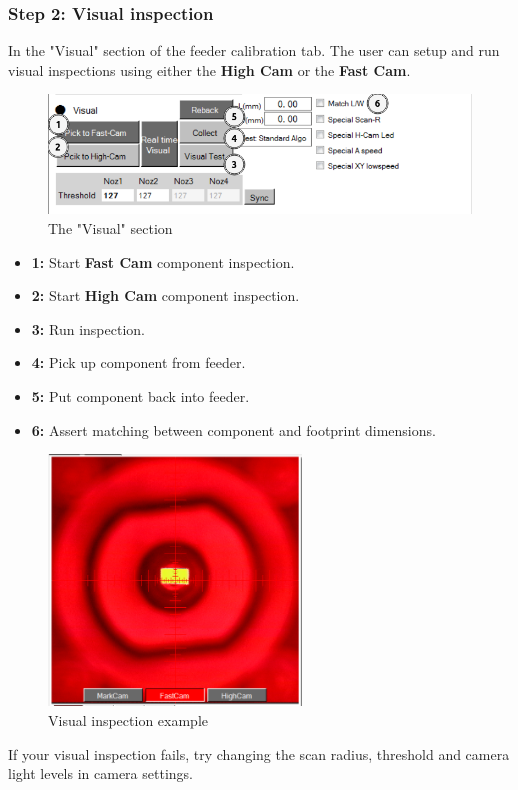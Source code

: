 \documentclass[a4paper,10pt]{report}
\begin{document}
\subsubsection{Step 2: Visual inspection}
In the "Visual" section of the feeder calibration tab. The user can setup and run visual inspections using either the \textbf{High Cam} or the \textbf{Fast Cam}.
 \begin{figure}[!htb]
 \centering
 \includegraphics[width=1\textwidth]{scrot25.png}
 \caption{The "Visual" section}
\end{figure}
\begin{itemize}
 \item \textbf{1:} Start \textbf{Fast Cam} component inspection.
 \item \textbf{2:} Start \textbf{High Cam} component inspection.
 \item \textbf{3:} Run inspection.
 \item \textbf{4:} Pick up component from feeder.
 \item \textbf{5:} Put component back into feeder.
 \item \textbf{6:} Assert matching between component and footprint dimensions.
\end{itemize}
 \begin{figure}[!htb]
 \centering
 \includegraphics[width=0.6\textwidth]{scrot26.png}
 \caption{Visual inspection example}
\end{figure}
\newpage
If your visual inspection fails, try changing the scan radius, threshold and camera light levels in camera settings.\\
\end{document}
